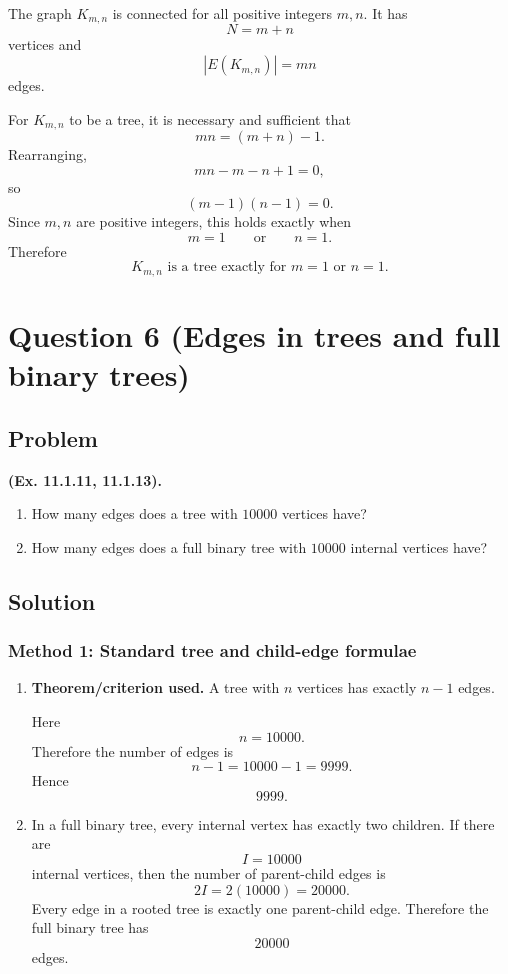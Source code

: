 \documentclass[12pt]{article}
\begin{document}
The graph $K_{m,n}$ is connected for all positive integers $m,n$. It has
\[
  N=m+n
\]
vertices and
\[
  |E(K_{m,n})|=mn
\]
edges.

For $K_{m,n}$ to be a tree, it is necessary and sufficient that
\[
  mn=(m+n)-1.
\]
Rearranging,
\[
  mn-m-n+1=0,
\]
so
\[
  (m-1)(n-1)=0.
\]
Since $m,n$ are positive integers, this holds exactly when
\[
  m=1
  \qquad\text{or}\qquad
  n=1.
\]
Therefore
\[
  \boxed{K_{m,n}\text{ is a tree exactly for }m=1\text{ or }n=1.}
\]

\newpage
\section{Question 6 (Edges in trees and full binary trees)}

\subsection{Problem}
\textbf{(Ex. 11.1.11, 11.1.13).}
\begin{enumerate}[label=(\alph*)]
  \item How many edges does a tree with $10000$ vertices have?
  \item How many edges does a full binary tree with $10000$ internal vertices have?
\end{enumerate}

\subsection{Solution}

\subsubsection{Method 1: Standard tree and child-edge formulae}
\begin{enumerate}[label=(\alph*)]
  \item \textbf{Theorem/criterion used.} A tree with $n$ vertices has exactly $n-1$ edges.

  Here
  \[
    n=10000.
  \]
  Therefore the number of edges is
  \[
    n-1=10000-1=9999.
  \]
  Hence
  \[
    \boxed{9999}.
  \]

  \item In a full binary tree, every internal vertex has exactly two children. If there are
  \[
    I=10000
  \]
  internal vertices, then the number of parent-child edges is
  \[
    2I=2(10000)=20000.
  \]
  Every edge in a rooted tree is exactly one parent-child edge. Therefore the full binary tree has
  \[
    \boxed{20000}
  \]
  edges.
\end{enumerate}
\end{document}

